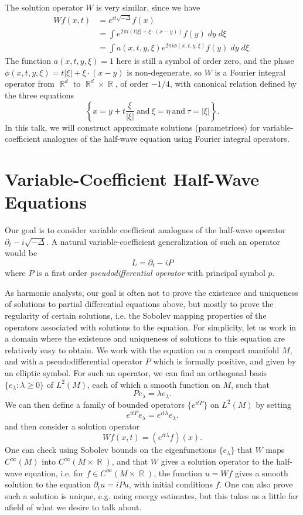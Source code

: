 \documentclass{article}
\theoremstyle{plain}
\theoremstyle{remark}
\theoremstyle{definition}
\DeclareMathOperator{\RR}{\mathbb{R}}
\begin{document}
The solution operator $W$ is very similar, since we have
%
\begin{align*}
	Wf(x,t) &= e^{it \sqrt{-\Delta}} f(x)\\
	&= \int e^{2 \pi i (t |\xi| + \xi \cdot (x - y))} f(y)\; dy\; d\xi\\
	&= \int a(x,t,y,\xi) e^{2 \pi i \phi(x,t,y,\xi)} f(y)\; dy\; d\xi.
\end{align*}
%
The function $a(x,t,y,\xi) = 1$ here is still a symbol of order zero, and the phase $\phi(x,t,y,\xi) = t |\xi| + \xi \cdot (x - y)$ is non-degenerate, so $W$ is a Fourier integral operator from $\RR^d$ to $\RR^d \times \RR$, of order $-1/4$, with canonical relation defined by the three equations
%
\[ \left\{ x = y + t \frac{\xi}{|\xi|}\ \text{and}\ \xi = \eta\ \text{and}\ \tau = |\xi| \right\}. \]
%
In this talk, we will construct approximate solutions (parametrices) for variable-coefficient analogues of the half-wave equation using Fourier integral operators.

\section{Variable-Coefficient Half-Wave Equations}

Our goal is to consider variable coefficient analogues of the half-wave operator $\partial_t - i \sqrt{-\Delta}$. A natural variable-coefficient generalization of such an operator would be
%
\[ L = \partial_t - i P \]
%
where $P$ is a first order \emph{pseudodifferential operator} with principal symbol $p$.

As harmonic analysts, our goal is often not to prove the existence and uniqueness of solutions to partial differential equations above, but mostly to prove the regularity of certain solutions, i.e. the Sobolev mapping properties of the operators associated with solutions to the equation. For simplicity, let us work in a domain where the existence and uniqueness of solutions to this equation are relatively easy to obtain. We work with the equation on a compact manifold $M$, and with a pseudodifferential operator $P$ which is formally positive, and given by an elliptic symbol. For such an operator, we can find an orthogonal basis $\{ e_\lambda : \lambda \geq 0 \}$ of $L^2(M)$, each of which a smooth function on $M$, such that
%
\[ Pe_\lambda = \lambda e_\lambda. \]
%
We can then define a family of bounded operators $\{ e^{itP} \}$ on $L^2(M)$ by setting
%
\[ e^{it P} e_\lambda = e^{it \lambda} e_\lambda. \]
%
and then consider a solution operator
%
\[ Wf(x,t) = (e^{it \lambda} f)(x). \]
%
One can check using Sobolev bounds on the eigenfunctions $\{ e_\lambda \}$ that $W$ maps $C^\infty(M)$ into $C^\infty(M \times \RR)$, and that $W$ gives a solution operator to the half-wave equation, i.e. for $f \in C^\infty(M \times \RR)$, the function $u = Wf$ gives a smooth solution to the equation $\partial_t u = iPu$, with initial conditions $f$. One can also prove such a solution is unique, e.g. using energy estimates, but this takes us a little far afield of what we desire to talk about.
\end{document}
